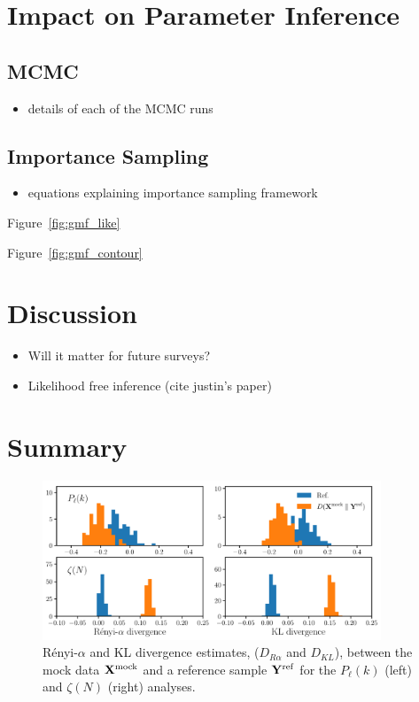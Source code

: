 \documentclass[12pt, letterpaper, preprint]{aastex}
\newcommand{\bitem}{\begin{itemize}}
\newcommand{\eitem}{\end{itemize}}
\begin{document}
\section{Impact on Parameter Inference}
\subsection{MCMC}
\bitem
    \item details of each of the MCMC runs
\eitem

\subsection{Importance Sampling} 
\bitem
    \item equations explaining importance sampling framework
\eitem
Figure~\ref{fig:gmf_like}


Figure~\ref{fig:gmf_contour}

\section{Discussion}
\bitem
    \item Will it matter for future surveys? 
    \item Likelihood free inference (cite justin's paper) 
\eitem

\section{Summary}

\begin{figure}
\begin{center}
\includegraphics[width=0.9\textwidth]{figs/kNNdiverg_Gauss.pdf}
\caption{R\'enyi-$\alpha$ and KL divergence estimates, ($D_{R\alpha}$ and $D_{KL}$), 
between the mock data ${\bf X}^\mathrm{mock}$ and a reference sample 
${\bf Y}^\mathrm{ref}$ for the $P_\ell(k)$ (left) and $\zeta(N)$ (right) analyses.}
\label{fig:div_gauss}
\end{center}
\end{figure}
\end{document}
